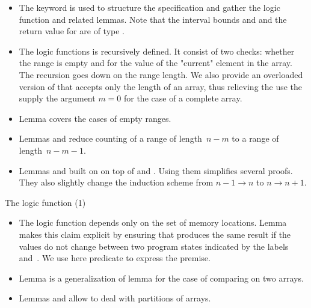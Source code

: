 \begin{itemize}
\item
The \acsl keyword  
is used to structure the specification and gather the logic function \Count and related lemmas.
Note that the interval bounds  and  and the return value for \Count are of type .

\item
The logic functions \Count is recursively defined.
It consist of two checks: whether the range is empty and for the value of
the "current" element in the array. The recursion goes down on the range length.
We also provide an overloaded version of \Count that accepts only
the length of an array, thus relieving the use the supply the argument $m=0$ for the
case of a complete array.

\item
Lemma  covers the cases of empty ranges.

\item
Lemmas  and 
 reduce
counting of a range of length~$n-m$ to a range of length~$n-m-1$.

\item
Lemmas  and  built on on top of \CountHit
and \CountMiss. 
Using them simplifies several \coq proofs.
They also slightly change the induction scheme from $n-1 \rightarrow n$
to $n \rightarrow n+1$.
\end{itemize}


\begin{logic}[hbt]
\begin{minipage}{\textwidth}

\end{minipage}
\caption{\label{logic:Count-1}The logic function \Count (1)}


\end{logic}

\FloatBarrier

\begin{itemize}

\item
The logic function \Count depends only on the set  of memory locations.
Lemma  makes this claim explicit by ensuring that
\Count produces the same result
if the values  do not change between two program states indicated
by the labels~ and~.
We use here predicate  to express the premise.

\item 
Lemma  is a generalization of lemma \CountUnchanged for
the case of comparing \Count on two arrays.

\item
Lemmas  and  
allow to deal with partitions of arrays.
\end{itemize}

